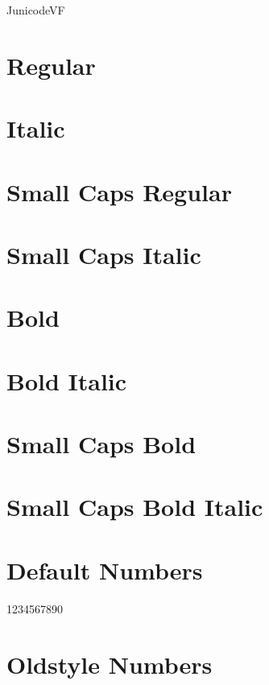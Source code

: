 \documentclass{article}
\begin{document}
\begin{center}
\huge{\jExp JunicodeVF}
\end{center}

\section*{Regular}

\lipsum[1]

\section*{Italic}
\textit{\lipsum[2]}

\section*{Small Caps Regular}
\textsc{\lipsum[5]}

\section*{Small Caps Italic}
\textsc{\textit{\lipsum[6]}}

\section*{Bold}
\textbf{\lipsum[3]}

\section*{Bold Italic}
\textbf{\emph{\lipsum[4]}}


\section*{Small Caps Bold}
\textbf{\textsc{\lipsum[5]}}

\section*{Small Caps Bold Italic}
\textbf{\textsc{\textit{\lipsum[6]}}}

\section*{Default Numbers}

1234567890

\section*{Oldstyle Numbers}
\end{document}
